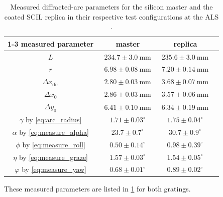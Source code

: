 \begin{table}[]
 \centering
 \caption[Measured diffracted-arc parameters for the silicon master and the coated SCIL replica in their respective test configurations at the ALS]{Measured diffracted-arc parameters for the silicon master and the coated SCIL replica in their respective test configurations at the ALS \cite{McCoy20b}.}\label{tab:arc_params}
 \begin{tabular}{cccc}
 \cline{1-3}
 measured parameter                                                     & \ master         		  & \ replica     \\ \hline
 $L$                                    & \ $234.7 \pm \SI{3.0}{\mm}$   & \ $235.6 \pm \SI{3.0}{\mm}$ \\
 $r$                                    & \ $6.98 \pm \SI{0.08}{\mm}$   & \ $7.20 \pm \SI{0.14}{\mm}$ \\
 $\Delta x_{\text{dir}}$ 				& \ $2.80 \pm \SI{0.03}{\mm}$   & \ $3.68 \pm \SI{0.07}{\mm}$ \\
 $\Delta x_0$  							& \ $2.86 \pm \SI{0.03}{\mm}$   & \ $3.57 \pm \SI{0.06}{\mm}$ \\
 $\Delta y_0$  							& \ $6.41 \pm \SI{0.10}{\mm}$   & \ $6.34 \pm \SI{0.19}{\mm}$ \\ 
 $\gamma$ by \cref{eq:arc_radius}       & \ $1.71 \pm 0.03^{\circ}$ 	& \ $1.75 \pm 0.04^{\circ}$   \\
 $\alpha$ by \cref{eq:measure_alpha}    & \ $23.7 \pm 0.7^{\circ}$  	& \ $30.7 \pm 0.9^{\circ}$    \\ 
 $\phi$ by \cref{eq:measure_roll}       & \ $0.50 \pm 0.14^{\circ}$ 	& \ $0.98 \pm 0.39^{\circ}$   \\
 $\eta$ by \cref{eq:measure_graze}      & \ $1.57 \pm 0.03^{\circ}$ 	& \ $1.54 \pm 0.05^{\circ}$   \\
 $\varphi$ by \cref{eq:measure_yaw}     & \ $0.68 \pm 0.01^{\circ}$ 	& \ $0.89 \pm 0.02^{\circ}$   \\ \hline
 \end{tabular}
 \end{table}
These measured parameters are listed in \cref{tab:arc_params} for both gratings. %

